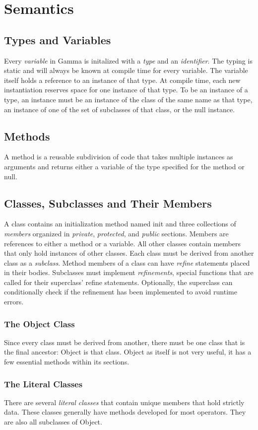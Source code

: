 \section{Semantics}
\subsection{Types and Variables}
Every \textit{variable} in Gamma is initalized with a \textit{type} and an \textit{identifier}. The typing is static and will always be known at compile time for every variable. The variable itself holds a reference to an instance of that type. At compile time, each new instantiation reserves space for one instance of that type. To be an instance of a type, an instance must be an instance of the class of the same name as that type, an instance of one of the set of subclasses of that class, or the null instance.
\subsection{Methods}
A method is a reusable subdivision of code that takes multiple instances as arguments and returns either a variable of the type specified for the method or null.
\subsection{Classes, Subclasses and Their Members}
A class contains an initialization method named init and three collections of \textit{members} organized in \textit{private}, \textit{protected}, and \textit{public} sections. Members are references to either a method or a variable. All other classes contain members that only hold instances of other classes. Each class must be derived from another class as a \textit{subclass}. Method members of a class can have \textit{refine} statements placed in their bodies. Subclasses must implement \textit{refinements}, special functions that are called for their superclass' refine statements. Optionally, the superclass can conditionally check if the refinement has been implemented to avoid runtime errors.
\subsubsection{The Object Class}
Since every class must be derived from another, there must be one class that is the final ancestor: Object is that class. Object as itself is not very useful, it has a few essential methods within its sections.
\subsubsection{The Literal Classes}
There are several \textit{literal classes} that contain unique members that hold strictly data. These classes generally have methods developed for most operators. They are also all subclasses of Object.